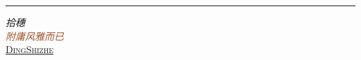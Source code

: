 
\newcommand*{\plogo}{\FiveFlowerOpen}

\newcommand{\Author}{\href{https://github.com/DingShizhe}{DingShizhe}}
\newcommand\myquotepage[3]{\thispagestyle{empty}\vspace*{\fill}\vspace*{\fill}\textcolor{#1}{\textit{#2\\\rightline{#3}}}\vspace*{\fill}\vspace*{\fill}\vspace*{\fill}}

\begin{titlepage}
	\raggedleft
	\rule{1pt}{\textheight} %
	\hspace{0.06\textwidth}
	\parbox[b]{0.80\textwidth}{
		{
            {\fontsize{40}{50}\selectfont
            \it 拾穗}
        }\\[2\baselineskip] %
		\textcolor{Sienna}{\large\textit{附庸风雅而已}}\\[4\baselineskip]{\large\textsc{\Author}}
        
		\vspace{0.5\textheight}
		\color{Sienna}{\noindent 且慢~\plogo}\\[\baselineskip]
	}
    
\end{titlepage}